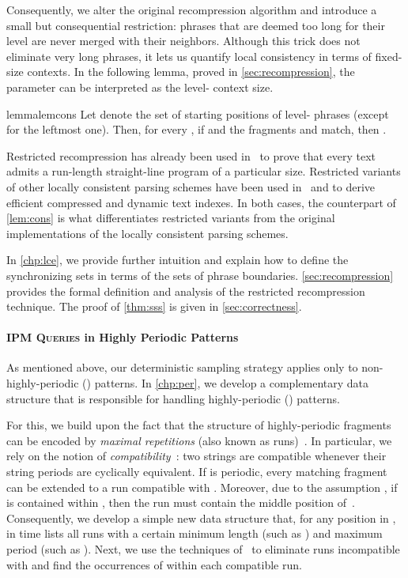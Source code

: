 \documentclass[a4paper]{article}
\theoremstyle{definition}
\theoremstyle{remark}
\newcommand{\IPM}{\textsc{IPM Queries}\xspace}
\begin{document}
Consequently, we alter the original recompression algorithm and introduce a small but consequential restriction: phrases that are deemed too long for their level are never merged with their neighbors. Although this trick does not eliminate very long phrases, it lets us quantify local consistency in terms of fixed-size contexts. In the following lemma, proved in \cref{sec:recompression}, the parameter  can be interpreted as the level- context size.
\begin{restatable}{lemma}{lemcons}\label{lem:cons}
Let  denote the set of starting positions of level- phrases (except for the leftmost one). 
Then, for every , if  and the fragments  and  match, then .
\end{restatable}

Restricted recompression has already been used in~\cite{DBLP:journals/tit/KociumakaNP23} to prove that every text admits a run-length straight-line program of a particular size.
Restricted variants of other locally consistent parsing schemes have been used in~\cite{DBLP:conf/latin/KociumakaNO22} and \cite{DBLP:conf/stoc/KempaK22} to derive efficient compressed and dynamic text indexes. In both cases, the counterpart of \cref{lem:cons} is what differentiates restricted variants from the original implementations of the locally consistent parsing schemes.

In \cref{chp:lce}, we provide further intuition and explain how to define the synchronizing sets in terms of the sets  of phrase boundaries.
\cref{sec:recompression} provides the formal definition and analysis of the restricted recompression technique.
The proof of \cref{thm:sss} is given in \cref{sec:correctness}.

\paragraph{\IPM in Highly Periodic Patterns}
As mentioned above, our deterministic sampling strategy applies only to non-highly-periodic () patterns.
In \cref{chp:per}, we develop a complementary data structure that is responsible for handling highly-periodic () patterns.

For this, we build upon the fact that the structure of highly-periodic fragments can be encoded by \emph{maximal repetitions} (also known as runs)~\cite{DBLP:journals/dam/Main89,DBLP:conf/focs/KolpakovK99,DBLP:journals/siamcomp/BannaiIINTT17}.
In particular, we rely on the notion of \emph{compatibility}~\cite{DBLP:journals/tcs/CrochemoreIKRRW14}: two strings are compatible whenever their 
string periods are cyclically equivalent.
If  is periodic, every matching fragment  can be extended to a run compatible with .
Moreover, due to the assumption , if  is contained within , then the run must contain the middle position of~.
Consequently, we develop a simple new data structure that, for any position in , in  time  
lists all runs with a certain minimum length (such as ) and maximum period (such as ). 
Next, we use the techniques of~\cite{DBLP:journals/tcs/CrochemoreIKRRW14} to eliminate runs incompatible with  
and find the occurrences of  within each compatible run.
\end{document}
